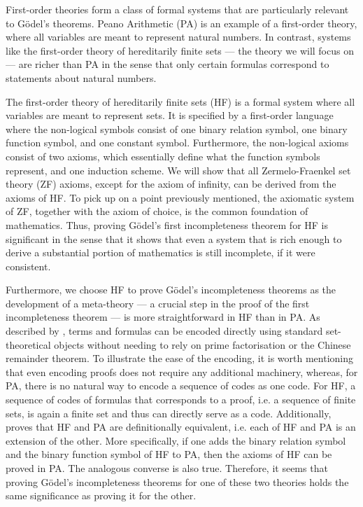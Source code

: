 First-order theories form a class of formal systems that are particularly relevant to 
Gödel's theorems.
Peano Arithmetic (PA) is an example of a first-order theory, 
where all variables are meant to represent natural numbers. 
In contrast, systems like the first-order theory of hereditarily finite sets — 
the theory we will focus on — are richer than PA in the sense that 
only certain formulas correspond to statements about natural numbers. 

The first-order theory of hereditarily finite sets (HF) is a formal system where all variables are 
meant to represent sets. It is specified by a first-order language where the non-logical symbols
consist of one binary relation symbol, one binary function symbol, and one constant symbol.
Furthermore, the non-logical axioms consist of two axioms, which essentially define what the 
function symbols represent, and one induction scheme.
We will show that all Zermelo-Fraenkel set theory (ZF) axioms, except for the axiom of infinity,
can be derived from the axioms of HF.
To pick up on a point previously mentioned, the axiomatic system of ZF, 
together with the axiom of choice, is the common foundation of mathematics.
Thus, proving Gödel's first incompleteness theorem for HF is significant in the sense that
it shows that even a system that is rich enough to derive a substantial portion of mathematics 
is still incomplete, if it were consistent.

Furthermore, we choose HF to prove Gödel's incompleteness theorems as 
the development of a meta-theory — a crucial step in the proof of the 
first incompleteness theorem — is more straightforward in HF than in PA.
As described by \cite{swierczkowski2003finite}, terms and formulas can be encoded directly 
using standard set-theoretical objects without needing to rely on prime factorisation or 
the Chinese remainder theorem.
To illustrate the ease of the encoding, it is worth mentioning that 
even encoding proofs does not require any additional machinery, whereas, for PA, there is no natural
way to encode a sequence of codes as one code.
For HF, a sequence of codes of formulas that corresponds to a proof, 
i.e. a sequence of finite sets, is again a finite set and thus can directly serve as a code.
Additionally, \cite{swierczkowski2003finite} proves that HF and PA are definitionally equivalent,
i.e. each of HF and PA is an extension of the other. More specifically,
if one adds the binary relation symbol and the binary function symbol of HF to PA, 
then the axioms of HF can be proved in PA. The analogous converse is also true.
Therefore, it seems that proving Gödel's incompleteness theorems for one of these two theories 
holds the same significance as proving it for the other.


